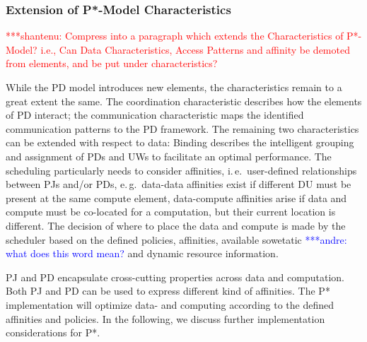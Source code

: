 \documentclass[conference,final]{IEEEtran}
\newcommand{\jhanote}[1]{ {\textcolor{red} { ***shantenu: #1 }}}
\newcommand{\alnote}[1]{ {\textcolor{blue} { ***andre: #1 }}}
\newcommand{\alnote}[1]{}
\newcommand{\jhanote}[1]{}
\begin{document}

\subsubsection*{Extension of P*-Model Characteristics}

\jhanote{Compress into a paragraph which extends the Characteristics
  of P*-Model? i.e., Can Data Characteristics, Access Patterns and
  affinity be demoted from elements, and be put under
  characteristics?}

While the PD model introduces new elements, the characteristics remain to a
great extent the same. The coordination characteristic describes how the
elements of PD interact; the communication characteristic maps the identified
communication patterns to the PD framework. The remaining two characteristics
can be extended with respect to data: Binding describes the intelligent grouping
and assignment of PDs and UWs to facilitate an optimal performance. The
scheduling particularly needs to consider affinities, i.\,e.\ user-defined
relationships between PJs and/or PDs, e.\,g.\ data-data affinities exist if
different DU must be present at the same compute element, data-compute
affinities arise if data and compute must be co-located for a computation, but
their current location is different. The decision of where to place the data and
compute is made by the scheduler based on the defined policies, affinities,
available sowetatic \alnote{what does this word mean?} and dynamic resource information.


PJ and PD encapsulate cross-cutting properties across data and
computation. Both PJ and PD can be used to express different kind of
affinities.  The P* implementation will optimize data- and computing
according to the defined affinities and policies. In the following, we
discuss further implementation considerations for P*.
\end{document}
